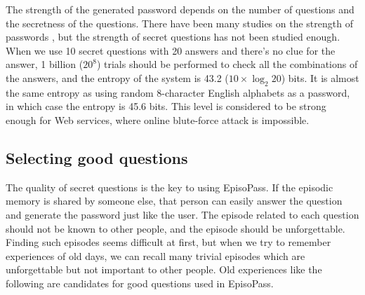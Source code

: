 \documentclass{article}
\begin{document}
The strength of the generated password depends on the number of
questions and the secretness of the questions.
%
There have been many studies on the strength of passwords
\cite{Hayashi:2011:DSP:1978942.1979326}%
\cite{Komanduri:2011:PPM:1978942.1979321}, %
but the strength of secret questions has not been studied enough.
%
%
When we use 10 secret questions with 20 answers and
there's no clue for the answer,
1 billion ($20^8$) trials should be performed to check
all the combinations of the answers,
and the entropy of the system is 43.2 ($10 \times \log_2 20$) bits.  %
%
%
It is almost the same entropy as using random 8-character English alphabets
as a password, in which case the entropy is 45.6 bits.
This level is considered to be strong enough for Web services,
where online blute-force attack is impossible\cite{Florencio:2007:SWP:1361419.1361429}.

\subsection{Selecting good questions}


The quality of secret questions is the key to using EpisoPass.
If the episodic memory is shared by someone else,
that person can easily answer the question and generate the
password just like the user.
%
The episode related to each question should not be known to other people,
and the episode should be unforgettable.
%
Finding such episodes seems difficult at first, but
when we try to remember experiences of old days,
we can recall many trivial episodes which are unforgettable but
not important to other people.
%
Old experiences like the following are candidates for
good questions used in EpisoPass.
\end{document}
